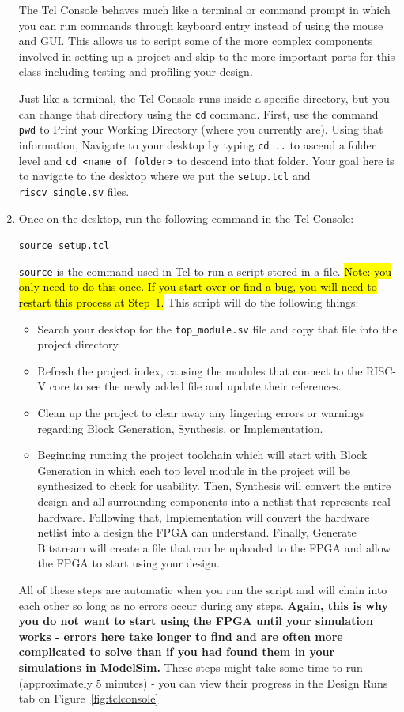 \documentclass{article}
\begin{document}
\begin{enumerate}
The Tcl Console behaves much like a terminal or command prompt in which you can
run commands through keyboard entry instead of using the mouse and GUI.  This
allows us to script some of the more complex components involved in setting up
a project and skip to the more important parts for this class including testing
and profiling your design.

Just like a terminal, the Tcl Console runs inside a specific directory, but you
can change that directory using the \verb|cd| command.  First, use the command
\verb|pwd| to Print your Working Directory (where you currently are).  Using
that information, Navigate to your desktop by typing \verb|cd ..| to
ascend a folder level and \verb|cd <name of folder>| to descend into that
folder.  Your goal here is to navigate to the desktop where we put the
\verb|setup.tcl| and \verb|riscv_single.sv| files.

\item Once on the desktop, run the following command in the Tcl Console:

\verb|source setup.tcl|

\verb|source| is the command used in Tcl to run a script stored in a file.
\hl{Note: you only need to do this once.  If you start over
  or find a bug, you will need to
  restart this process at Step~$1$.}  This
script will do the following things:
\begin{itemize}
\item Search your desktop for the \verb|top_module.sv| file and copy that
  file into the project directory.
	
\item Refresh the project index, causing the modules that connect to the
  RISC-V core to see the newly added file and update their references.
	
\item Clean up the project to clear away any lingering errors or warnings
  regarding Block Generation, Synthesis, or Implementation.
	
\item Beginning running the project toolchain which will start with Block
  Generation in which each top level module in the project will be
  synthesized to check for usability.  Then, Synthesis will convert the entire
  design and all surrounding components into a netlist
  that represents real hardware.  Following that, Implementation will convert
  the hardware netlist into a design the FPGA can understand.  Finally,
  Generate Bitstream will create a file that can be uploaded to the FPGA and
  allow the FPGA to start using your design.
\end{itemize}
All of these steps are automatic when you run the script and will chain into
each other so long as no errors occur during any steps.  \textbf{Again, this is
why you do not want to start using the FPGA until your simulation works - errors
here take longer to find and are often more complicated to solve than if you had
found them in your simulations in ModelSim.}  These steps might take some time to
run (approximately 5 minutes) - you can view their progress in the Design Runs
tab on Figure~\ref{fig:tclconsole}


\end{enumerate}
\end{document}

